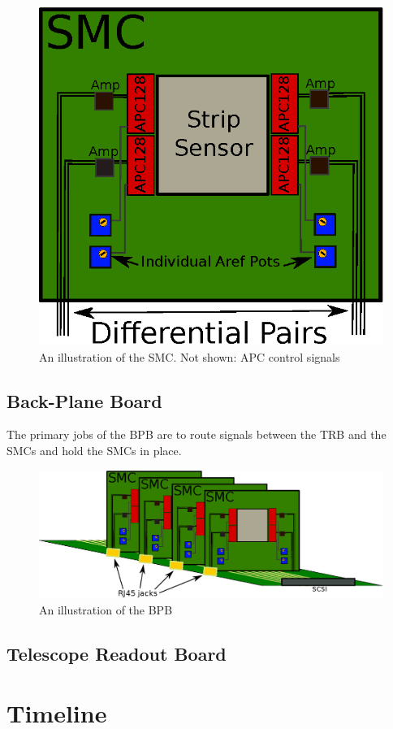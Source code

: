 \documentclass{article}
\begin{document}
\begin{figure}[h!]
  \centering
  \includegraphics{./figures/SMC.eps}
  \caption{An illustration of the SMC. Not shown: \gls{APC} control signals}
  \label{fig:SMC}
\end{figure}


\subsection{Back-Plane Board}

The primary jobs of the \gls{BPB} are to route signals between the \gls{TRB} and the \gls{SMC}s and hold the \gls{SMC}s in place.

\begin{figure}[h!]
  \centering
  \includegraphics{./figures/BPB.eps}
  \caption{An illustration of the BPB}
  \label{fig:PBP}
\end{figure}

\subsection{Telescope Readout Board}

\section{Timeline}

\newpage



\glsaddall
\printglossaries
\end{document}
